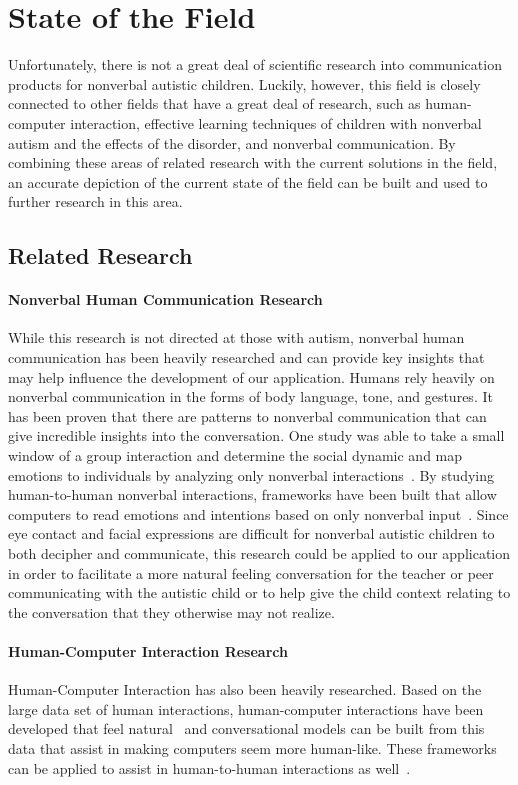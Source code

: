 \chapter{State of the Field}
Unfortunately, there is not a great deal of scientific research into communication products for nonverbal autistic children. Luckily, however, this field is closely connected to other fields that have a great deal of research, such as human-computer interaction, effective learning techniques of children with nonverbal autism and the effects of the disorder, and nonverbal communication.  By combining these areas of related research with the current solutions in the field, an accurate depiction of the current state of the field can be built and used to further research in this area.
\section{Related Research}
\subsubsection{Nonverbal Human Communication Research}
While this research is not directed at those with autism, nonverbal human communication has been heavily researched and can provide key insights that may help influence the development of our application. Humans rely heavily on nonverbal communication in the forms of body language, tone, and gestures. It has been proven that there are patterns to nonverbal communication that can give incredible insights into the conversation. One study was able to take a small window of a group interaction and determine the social dynamic and map emotions to individuals by analyzing only nonverbal interactions~\cite{jayagopi}. By studying human-to-human nonverbal interactions, frameworks have been built that allow computers to read emotions and intentions based on only nonverbal input~\cite{sumi}. Since eye contact and facial expressions are difficult for nonverbal autistic children to both decipher and communicate, this research could be applied to our application in order to facilitate a more natural feeling conversation for the teacher or peer communicating with the autistic child or to help give the child context relating to the conversation that they otherwise may not realize.

\subsubsection{Human-Computer Interaction Research}
Human-Computer Interaction has also been heavily researched. Based on the large data set of human interactions, human-computer interactions have been developed that feel natural~\cite{rich} and conversational models can be built from this data that assist in making computers seem more human-like. These frameworks can be applied to assist in human-to-human interactions as well~\cite{sumi}.
